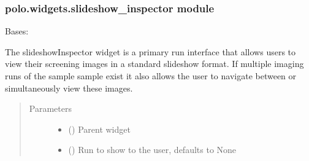 \documentclass[letterpaper,10pt,english]{sphinxmanual}
\begin{document}
\subsubsection{polo.widgets.slideshow\_inspector module}
\label{\detokenize{polo.widgets:module-polo.widgets.slideshow_inspector}}\label{\detokenize{polo.widgets:polo-widgets-slideshow-inspector-module}}

\begin{fulllineitems}
\label{\detokenize{polo.widgets:polo.widgets.slideshow_inspector.slideshowInspector}}
Bases: 

The slideshowInspector widget is a primary run interface that allows
users to view their screening images in a standard slideshow format. If
multiple imaging runs of the sample sample exist it also allows the user to
navigate between or simultaneously view these images.
\begin{quote}\begin{description}
\item[{Parameters}] \leavevmode\begin{itemize}
\item {} 
 () \textendash{} Parent widget

\item {} 
 ({\hyperref[\detokenize{polo.crystallography:polo.crystallography.run.Run}]{}}\sphinxstyleliteralemphasis{\sphinxupquote{, }}) \textendash{} Run to show to the user, defaults to None


\end{itemize}
\end{description}
\end{quote}
\end{fulllineitems}
\end{document}
